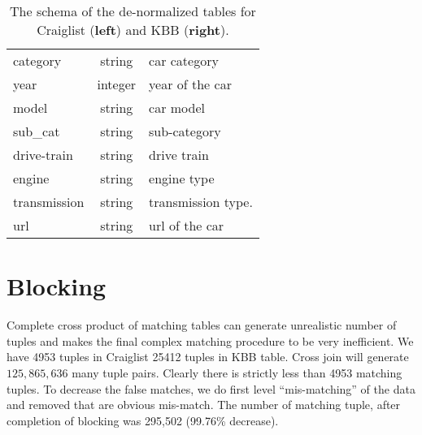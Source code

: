 \documentclass[dvips,11pt]{article}
\begin{document}
\begin{table}[!ht]
{\begin{tabular}{|p{0.75in}|c|p{1.3in}|}
      category & string & car category\\
      year & integer &year of the car\\
      model & string & car model\\
      sub\_cat & string & sub-category\\
      drive-train & string & drive train\\
      engine & string & engine type\\
      transmission & string & transmission type.\\
      url & string & url of the car\\
      \hline
    \end{tabular}
  }
  \label{schema}
  \caption{The schema of the de-normalized tables for Craiglist ({\bf left}) and KBB ({\bf right}).}
\end{table}

\newpage
\section{Blocking}
Complete cross product of matching tables can generate unrealistic number of tuples and makes the
final complex matching procedure to be very inefficient. We have 4953 tuples in Craiglist 25412
tuples in KBB table. Cross join will generate $125,865,636$ many tuple pairs. Clearly there is
strictly less than 4953 matching tuples. To decrease the false matches, we do first level
``mis-matching'' of the data and removed that are obvious mis-match.  The number of matching tuple,
after completion of blocking was 295,502 (99.76\% decrease). 
\end{document}
